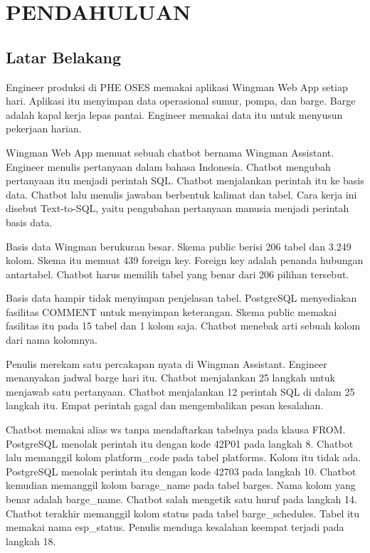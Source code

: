 \cleardoublepage %
\chapter{PENDAHULUAN}
\label{chap:pendahuluan}
\section{Latar Belakang}
Engineer produksi di PHE OSES memakai aplikasi Wingman Web App setiap hari. Aplikasi itu menyimpan data operasional sumur, pompa, dan barge. Barge adalah kapal kerja lepas pantai. Engineer memakai data itu untuk menyusun pekerjaan harian.

Wingman Web App memuat sebuah chatbot bernama Wingman Assistant. Engineer menulis pertanyaan dalam bahasa Indonesia. Chatbot mengubah pertanyaan itu menjadi perintah SQL. Chatbot menjalankan perintah itu ke basis data. Chatbot lalu menulis jawaban berbentuk kalimat dan tabel. Cara kerja ini disebut Text-to-SQL, yaitu pengubahan pertanyaan manusia menjadi perintah basis data.

Basis data Wingman berukuran besar. Skema public berisi 206 tabel dan 3.249 kolom. Skema itu memuat 439 foreign key. Foreign key adalah penanda hubungan antartabel. Chatbot harus memilih tabel yang benar dari 206 pilihan tersebut.

Basis data hampir tidak menyimpan penjelasan tabel. PostgreSQL menyediakan fasilitas COMMENT untuk menyimpan keterangan. Skema public memakai fasilitas itu pada 15 tabel dan 1 kolom saja. Chatbot menebak arti sebuah kolom dari nama kolomnya.

Penulis merekam satu percakapan nyata di Wingman Assistant. Engineer menanyakan jadwal barge hari itu. Chatbot menjalankan 25 langkah untuk menjawab satu pertanyaan. Chatbot menjalankan 12 perintah SQL di dalam 25 langkah itu. Empat perintah gagal dan mengembalikan pesan kesalahan.

Chatbot memakai alias ws tanpa mendaftarkan tabelnya pada klausa FROM. PostgreSQL menolak perintah itu dengan kode 42P01 pada langkah 8. Chatbot lalu memanggil kolom platform\_code pada tabel platforms. Kolom itu tidak ada. PostgreSQL menolak perintah itu dengan kode 42703 pada langkah 10. Chatbot kemudian memanggil kolom barage\_name pada tabel barges. Nama kolom yang benar adalah barge\_name. Chatbot salah mengetik satu huruf pada langkah 14. Chatbot terakhir memanggil kolom status pada tabel barge\_schedules. Tabel itu memakai nama esp\_status. Penulis menduga kesalahan keempat terjadi pada langkah 18.

